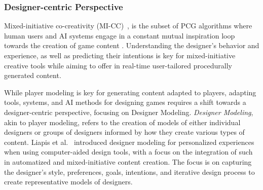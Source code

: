 
\subsubsection{Designer-centric Perspective}

Mixed-initiative co-creativity (MI-CC)~\cite{p10yannakakis2014micc}, is the subset of PCG algorithms where human users and AI systems engage in a constant mutual inspiration loop towards the creation of game content \cite{p10charity2020baba,machado2019pitako,shaker2013ropossum,smith_tanagra:_2011,liapis_generating_2013}. Understanding the designer's behavior and experience, as well as predicting their intentions is key for mixed-initiative creative tools while aiming to offer in real-time user-tailored procedurally generated content. 

While player modeling is key for generating content adapted to players, adapting tools, systems, and AI methods for designing games requires a shift towards a designer-centric perspective, focusing on Designer Modeling. \emph{Designer Modeling}, akin to player modeling, refers to the creation of models of either individual designers or groups of designers informed by how they create various types of content. Liapis et al.~\cite{p10Liapis2013-designerModel,Liapis2014-designerModelImpl} introduced designer modeling for personalized experiences when using computer-aided design tools, with a focus on the integration of such in automatized and mixed-initiative content creation. The focus is on capturing the designer's style, preferences, goals, intentions, and iterative design process to create representative models of designers.




